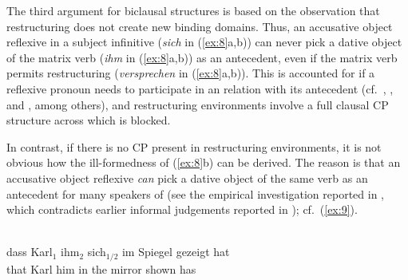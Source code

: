\documentclass[output=paper]{langsci/langscibook}
\begin{document}
\largerpage[1]
The third argument for biclausal structures is based on the observation that
restructuring does not create new binding domains.  Thus, an accusative object
reflexive in a subject  infinitive ({\it sich} in (\ref{ex:8}a,b)) can
never pick a dative object of the matrix verb ({\it ihm} in (\ref{ex:8}a,b)) as
an antecedent, even if the matrix verb permits restructuring ({\it versprechen}
in (\ref{ex:8}a,b)). This is accounted for if a reflexive pronoun needs to
participate in an  relation with its antecedent (cf.\
\citealt{Reuland:01,Reuland:11}, \citealt{Fischer:04}, and \citealt{Hicks:09},
among others), and restructuring environments involve a full clausal CP
structure across which \isi{Agree} is blocked.

\ea\label{ex:8} 
    \z
\z

In contrast, if there is no CP present in restructuring environments, it is not
obvious how the ill-formedness of (\ref{ex:8}b) can be derived. The reason is
that an accusative\is{accusative case} object reflexive {\it can} pick a dative object of the same
verb as an antecedent for many speakers of \ili{German} (see the empirical
investigation reported in
\citealt{Sternefeld&Featherston:03,Featherston&Sternefeld:03}, which
contradicts earlier informal judgements reported in \citealt{Grewendorf:88});
cf.\ (\ref{ex:9}).

\ea\label{ex:9} \\
    \gll dass Karl$_1$  ihm$_2$   sich$_{1/2}$ im Spiegel gezeigt hat\\
        that Karl\textsubscript{\Nom}   him\textsubscript{\Dat}  \Refl{} {in the} mirror shown has\\
\z
\end{document}
